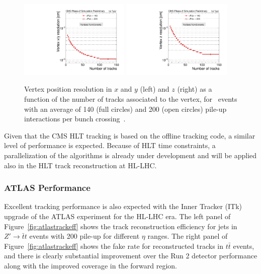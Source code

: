 \begin{figure}[t]
\begin{center}
  \includegraphics[width=0.47\textwidth]{figures/cmsupgrade/TDR-17-001_fig6_13_a_RecoAllAssoc2GenMatched_ResolX_vs_NumTracks_Sigma_PU.pdf} \hfill
  \includegraphics[width=0.47\textwidth]{figures/cmsupgrade/TDR-17-001_fig6_13_b_RecoAllAssoc2GenMatched_ResolZ_vs_NumTracks_Sigma_PU.pdf}
  \caption{Vertex position resolution in $x$ and $y$ (left) and $z$ (right) as a function of the number of tracks associated to the vertex, for \ttbar~events with an average of 140 (full circles) and 200 (open circles) pile-up interactions per bunch crossing~\cite{Collaboration:2272264}.
 }
  \label{fig:cmsvertex}
\end{center}
\end{figure}

Given that the CMS HLT tracking is based on the offline tracking code, a similar level of performance is expected.
Because of HLT time constraints, a parallelization of the algorithms is already under development and will be applied also in the HLT track reconstruction at HL-LHC.

\subsubsection{ATLAS Performance}


Excellent tracking performance is also expected with the Inner Tracker (ITk) upgrade of the ATLAS experiment for the HL-LHC era.
The left panel of Figure~\ref{fig:atlastrackeff} shows the track reconstruction efficiency for jets in $Z'\to\bar{t}t$ events with 200 pile-up for different $\eta$ ranges. The right panel of Figure~\ref{fig:atlastrackeff} shows the fake rate for reconstructed tracks in $t\bar t$ events, and there is clearly substantial improvement over the Run 2 detector performance along with the improved coverage in the forward region.

